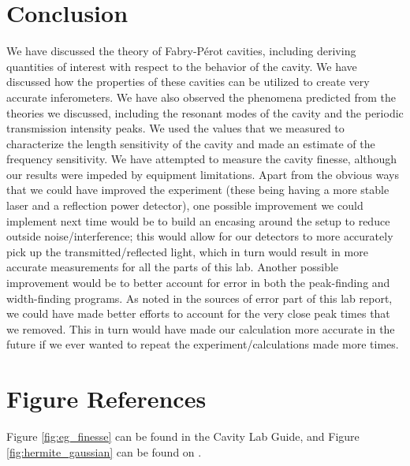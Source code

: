 \documentclass[twocolumn,amsmath,amssymb,pra]{revtex4-2}
\begin{document}
\section{Conclusion}
We have discussed the theory of Fabry-P\'{e}rot cavities, including deriving quantities of interest with respect to the behavior of the cavity. We have discussed how the properties of these cavities can be utilized to create very accurate  inferometers. We have also observed the phenomena predicted from the theories we discussed, including the resonant modes of the cavity and the periodic transmission intensity peaks. We used the values that we measured to characterize the length sensitivity of the cavity and made an estimate of the frequency sensitivity. We have attempted to measure the cavity finesse, although our results were impeded by equipment limitations.
Apart from the obvious ways that we could have improved the experiment (these being having a more stable laser and a reflection power detector), one possible improvement we could implement next time would be to build an encasing around the setup to reduce outside noise/interference; this would allow for our detectors to more accurately pick up the transmitted/reflected light, which in turn would result in more accurate measurements for all the parts of this lab.
Another possible improvement would be to better account for error in both the peak-finding and width-finding programs. As noted in the sources of error part of this lab report, we could have made better efforts to account for the very close peak times that we removed. This in turn would have made our calculation more accurate in the future if we ever wanted to repeat the experiment/calculations made more times.

\section{Figure References}
Figure \ref{fig:eg_finesse} can be found in the Cavity Lab Guide, and Figure \ref{fig:hermite_gaussian} can be found on \cite{wiki:HG}.



\end{document}
